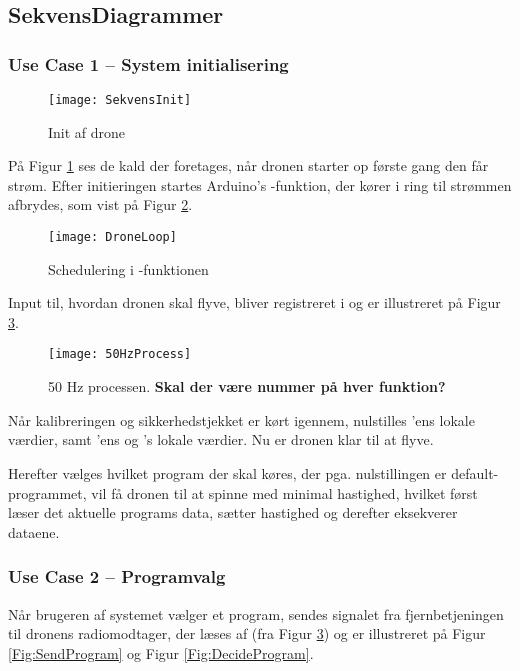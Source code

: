 \documentclass[Main]{subfiles}
\begin{document}
\subsection{SekvensDiagrammer}

\subsubsection{Use Case 1 -- System initialisering}

\begin{figure}[H]
\centering
\texttt{[image: SekvensInit]}
\caption{Init af drone}
\label{Fig:SekvInit}
\end{figure}

På Figur \ref{Fig:SekvInit} ses de kald der foretages, når dronen starter op første gang den får strøm.
Efter initieringen startes Arduino's -funktion, der kører i ring til strømmen afbrydes, som vist på Figur \ref{Fig:SekvDroneHz}.


\begin{figure}[H]
\centering
\texttt{[image: DroneLoop]}
\caption{Schedulering i -funktionen}
\label{Fig:SekvDroneHz}
\end{figure}

Input til, hvordan dronen skal flyve, bliver registreret i  og er illustreret på Figur \ref{Fig:50Hz}.

\begin{figure}[H]
\centering
\texttt{[image: 50HzProcess]}
\caption{50 Hz processen. \textbf{Skal der være nummer på hver funktion?}}
\label{Fig:50Hz}
\end{figure}

Når kalibreringen og sikkerhedstjekket er kørt igennem, nulstilles 'ens lokale værdier, samt 'ens og 's lokale værdier.
Nu er dronen klar til at flyve.

Herefter vælges hvilket program der skal køres, der pga. nulstillingen er default-programmet, vil få dronen til at spinne med minimal hastighed, hvilket først læser det aktuelle programs data, sætter hastighed og derefter eksekverer dataene.


\newpage
\subsubsection{Use Case 2 -- Programvalg}
Når brugeren af systemet vælger et program, sendes signalet fra fjernbetjeningen til dronens radiomodtager, der læses af  (fra Figur \ref{Fig:50Hz}) og er illustreret på Figur \ref{Fig:SendProgram} og Figur \ref{Fig:DecideProgram}.
\end{document}
